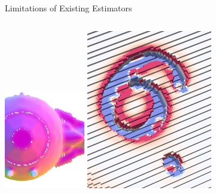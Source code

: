 \documentclass[11pt]{beamer}
\begin{document}
    \begin{frame}{Limitations of Existing Estimators}
        \centering
        \begin{columns}
            \includegraphics[width=0.8\linewidth]{pictures/tie256-IIN-flat-small-zoomed}
            \includegraphics[width=0.8\linewidth]{pictures/d20-H-II-small-zoomed}

\end{columns}
\end{frame}
\end{document}
